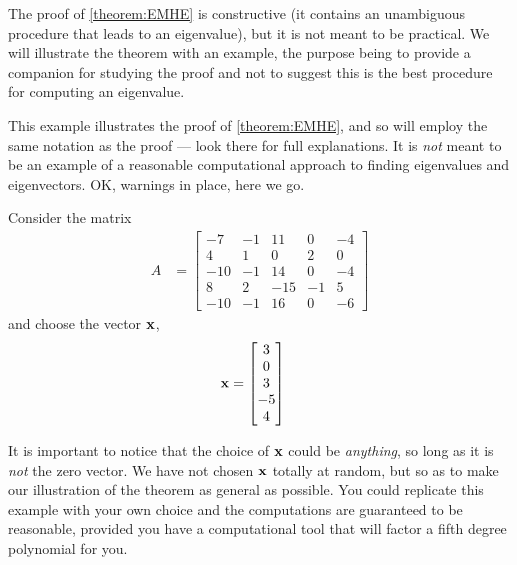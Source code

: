 \documentclass{ximera}
\begin{document}
The proof of \ref{theorem:EMHE} is constructive (it contains an unambiguous procedure that leads to an eigenvalue), but it is not meant to be practical.  We will illustrate the theorem with an example, the purpose being to provide a companion for studying the proof and not to suggest this is the best procedure for computing an eigenvalue.



\begin{example}

  This example illustrates the proof of \ref{theorem:EMHE}, and so
  will employ the same notation as the proof --- look there for full
  explanations.  It is \textit{not} meant to be an example of a
  reasonable computational approach to finding eigenvalues and
  eigenvectors.  OK, warnings in place, here we go.

Consider the matrix
\begin{align*}
A&=\begin{bmatrix}
-7 & -1 & 11 & 0 & -4\\
4 & 1 & 0 & 2 & 0\\
-10 & -1 & 14 & 0 & -4\\
8 & 2 & -15 & -1 & 5\\
-10 & -1 & 16 & 0 & -6
\end{bmatrix}
\end{align*}
and choose the vector $\mathbf{x}$,
\begin{align*}
\mathbf{x}&=\begin{bmatrix}3\\0\\3\\-5\\4\end{bmatrix}
\end{align*}

It is important to notice that the choice of $\mathbf{x}$ could be
\textit{anything}, so long as it is \textit{not} the zero vector.  We
have not chosen $\mathbf{x}$ totally at random, but so as to make our
illustration of the theorem as general as possible.  You could
replicate this example with your own choice and the computations are
guaranteed to be reasonable, provided you have a computational tool
that will factor a fifth degree polynomial for you.


\end{example}
\end{document}
